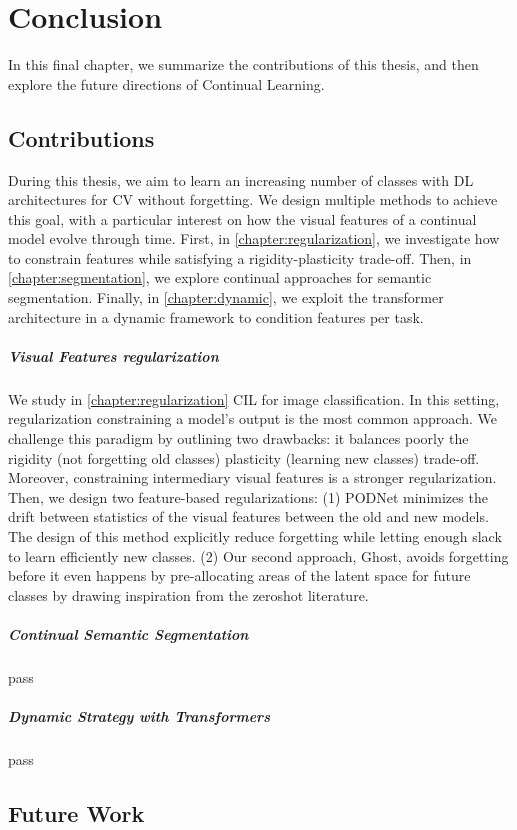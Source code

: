 \chapter{Conclusion}
\label{chapter:conclusion}

{}


In this final chapter, we summarize the contributions of this thesis, and then
explore the future directions of Continual Learning.

\section{Contributions}

During this thesis, we aim to learn an increasing number of classes with \ac{DL} architectures for
\ac{CV} without forgetting. We design multiple methods to achieve this goal, with a particular
interest on how the visual features of a continual model evolve through time. First, in \autoref{chapter:regularization}, we
investigate how to constrain features while satisfying a rigidity-plasticity trade-off.
Then, in \autoref{chapter:segmentation}, we explore continual approaches for
semantic segmentation. Finally, in \autoref{chapter:dynamic}, we exploit the transformer
architecture in a dynamic framework to condition features per task.

\paragraph{Visual Features regularization} We study in \autoref{chapter:regularization} \ac{CIL} for
image classification. In this setting, regularization constraining a model's output is the most
common approach. We challenge this paradigm by outlining two drawbacks: it balances poorly the
rigidity (not forgetting old classes) \vs plasticity (learning new classes) trade-off. Moreover,
constraining intermediary visual features is a stronger regularization. Then, we design two
feature-based regularizations: (1) PODNet minimizes the drift between statistics of the visual
features between the old and new models. The design of this method explicitly reduce forgetting
while letting enough slack to learn efficiently new classes. (2) Our second approach, Ghost, avoids
forgetting before it even happens by pre-allocating areas of the latent space for future classes by
drawing inspiration from the zeroshot literature.

\paragraph{Continual Semantic Segmentation} pass

\paragraph{Dynamic Strategy with Transformers} pass


\section{Future Work}



